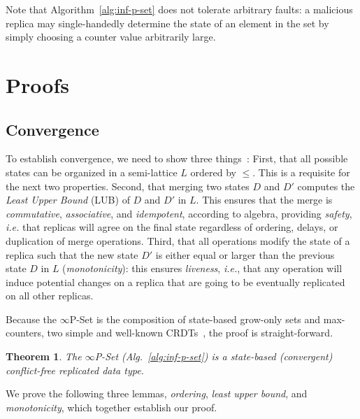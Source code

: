 \documentclass[11pt, oneside]{article}   	%
\newtheorem{theorem}{Theorem}
\begin{document}
Note that Algorithm~\ref{alg:inf-p-set} does not tolerate arbitrary faults: a malicious replica may single-handedly determine the state of an element in the set by simply choosing a counter value arbitrarily large.

\section{Proofs}
\label{sec:proofs}

\subsection{Convergence}

To establish convergence, we need to show three things~\cite{shapiro:hal-00932836}: First, that all possible states can be organized in a semi-lattice $L$ ordered by $\leq$. This is a requisite for the next two properties. Second, that merging two states $D$ and $D'$ computes the \textit{Least Upper Bound} (LUB) of $D$ and $D'$ in $L$. This ensures that the merge is \textit{commutative}, \textit{associative}, and \textit{idempotent}, according to algebra, providing \textit{safety}, \textit{i.e.} that replicas will agree on the final state regardless of ordering, delays, or duplication of merge operations. Third, that all operations modify the state of a replica such that the new state $D'$ is either equal or larger than the previous state $D$ in $L$ (\textit{monotonicity}): this ensures \textit{liveness}, \textit{i.e.}, that any operation will induce potential changes on a replica that are going to be eventually replicated on all other replicas. 

Because the $\infty$P-Set is the composition of state-based grow-only sets and max-counters, two simple and well-known CRDTs~\cite{shapiro:inria-00555588}, the proof is straight-forward.


\begin{theorem}
\label{proof:state-crdt}
The $\infty$P-Set (Alg.~\ref{alg:inf-p-set}) is a state-based (convergent) conflict-free replicated data type.
\end{theorem}

We prove the following three lemmas, \textit{ordering}, \textit{least upper bound}, and \textit{monotonicity}, which together establish our proof.
\end{document}
